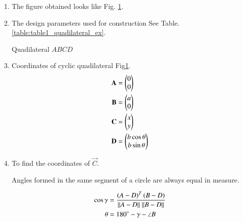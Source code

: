 \renewcommand{\theequation}{\theenumi}
\begin{enumerate}[label=\thesubsection.\arabic*.,ref=\thesubsection.\theenumi]

\begin{figure}[!ht]
\centering
\resizebox{\columnwidth}{!}{}
\caption{Cyclic quadilateral by Latex-Tikz}
\label{fig:cyclic_quad_quadilateral_ex}	
\end{figure}

\item The figure obtained looks like Fig. \ref{fig:cyclic_quad_quadilateral_ex}.\\ 

\item The design parameters used for construction See Table. \ref{table:table1_quadilateral_ex}.
\begin{table}[ht!]
\centering

\caption{Quadilateral $ABCD$}
\label{table:table1_quadilateral_ex}	
\end{table} 

\item Coordinates of cyclic quadilateral Fig\ref{fig:cyclic_quad_quadilateral_ex}. \\
\begin{align}
\mathbf{A} &=\begin{pmatrix}0\\0\end{pmatrix} \label{eq:constr_a_quadilateral_ex}\\
\mathbf{B} &=\begin{pmatrix}a\\0\end{pmatrix} \label{eq:constr_b_quadilateral_ex}\\
\mathbf{C} &=\begin{pmatrix}x\\y\end{pmatrix} \label{eq:constr_c_quadilateral_ex}\\
\mathbf{D} &= \begin{pmatrix}b\cos{\theta}\\b\sin{\theta}\end{pmatrix}\label{eq:constr_d_quadilateral_ex}
\end{align}

\item To find the coordinates of $\vec{C}$. 
\begin{theorem}
Angles formed in the same segment of a circle are always equal in measure.
\end{theorem} 
\begin{align}
\cos{\gamma} &= \frac{\left(A-D\right)^T\left(B-D\right)}{\| A -D \| \ \|B-D\|} \\
\theta &= 180\degree - \gamma - \angle B
\end{align}


\end{enumerate}
